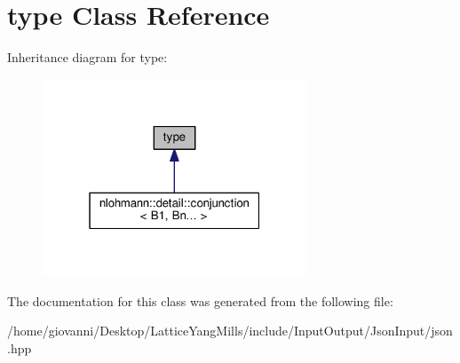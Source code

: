 \hypertarget{classstd_1_1conditional_1_1type}{}\section{type Class Reference}
\label{classstd_1_1conditional_1_1type}


Inheritance diagram for type\+:\nopagebreak
\begin{figure}[H]
\begin{center}
\leavevmode
\includegraphics[width=223pt]{classstd_1_1conditional_1_1type__inherit__graph}
\end{center}
\end{figure}


The documentation for this class was generated from the following file\+:\begin{DoxyCompactItemize}
\item 
/home/giovanni/\+Desktop/\+Lattice\+Yang\+Mills/include/\+Input\+Output/\+Json\+Input/json.\+hpp\end{DoxyCompactItemize}
